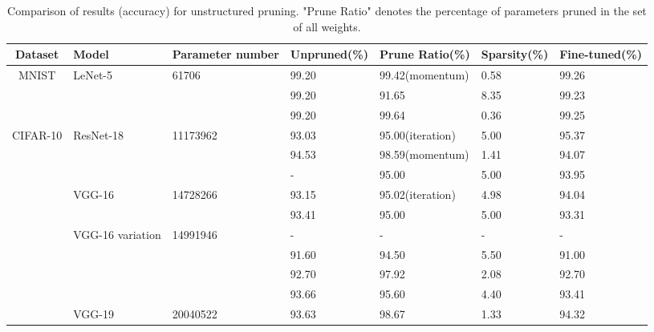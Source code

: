 \begin{table}[!htbp]
	\caption{Comparison of results (accuracy) for unstructured pruning. "Prune Ratio" denotes the percentage of parameters pruned in the set of all weights. }
	\centering
	\begin{tabular}{c|l|l|l|l|l|l}
		\hline
		Dataset & Model & Parameter number &  Unpruned(\%) & Prune Ratio(\%)& Sparsity(\%)  & Fine-tuned(\%) \\\hline 
	    \multirow{3}{*}{MNIST} &  \multirow{3}{*}{LeNet-5} &  \multirow{3}{*}{61706} & 99.20 & 99.42(momentum)     &   0.58   &    99.26\\
        & & & 99.20 &    91.65\cite{han2015learning}  &    8.35  &    99.23 \\
        & &    & 99.20 &    99.64\cite{molchanov2017variational} &    0.36  &    99.25\\\hline      
		\multirow{12}{*}{CIFAR-10} &  \multirow{3}{*}{ResNet-18}  & \multirow{3}{*}{11173962} &93.03 &    95.00(iteration) &    5.00   &    95.37 \\
		& & & 94.53 & 98.59(momentum) & 1.41 & 94.07 \\
		& & & - &    95.00\cite{he2018make}  &    5.00  &    93.95 \\\cline{2-7}
         &  \multirow{2}{*}{VGG-16}  & \multirow{2}{*}{14728266} &93.15 &    95.02(iteration) &    4.98   &    94.04\\
         & &   & 93.41 &    95.00\cite{dettmers2019sparse} &    5.00   &    93.31\\\cline{2-7}
         &  \multirow{4}{*}{VGG-16 variation} & \multirow{4}{*}{14991946} &- &    - &    -   &    -\\
         & &   & 91.60 &    94.50\cite{louizos2017bayesian} &    5.50   &    91.00\\
         & &   & 92.70 &    97.92\cite{molchanov2017variational} &    2.08   &    92.70\\
         & &   & 93.66 &    95.60\cite{liu2017learning} &    4.40   &    93.41\\\cline{2-7}
         &   \multirow{3}{*}{VGG-19}
         &\multirow{3}{*}{20040522} & 93.63 &    98.67  &    1.33  &    94.32\\

\end{tabular}
\end{table}
